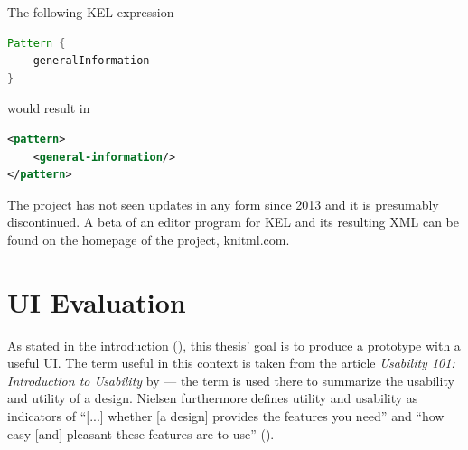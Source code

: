The following KEL expression

\begin{lstlisting}[language=Java, caption=Example expression in KnitML]
Pattern {
    generalInformation
}
\end{lstlisting}

would result in

\begin{lstlisting}[language=XML, caption=Example expression in KnitML: XML result]
<pattern>
    <general-information/>
</pattern>
\end{lstlisting}

The project has not seen updates in any form since 2013 and it is presumably discontinued. A beta of an editor program for KEL and its resulting XML can be found on the homepage of the project, knitml.com.

\section{UI Evaluation}
\label{uievaluation}
As stated in the introduction (), this thesis' goal is to produce a prototype with a useful \gls{UI}.
The term useful in this context is taken from the article \textit{Usability 101: Introduction to Usability} by \cite{nielsen2014} --- the term is used there to summarize the usability and utility of a design. Nielsen furthermore defines utility and usability as indicators of ``[...] whether [a design] provides the features you need'' and ``how easy [and] pleasant these features are to use'' (\cite{nielsen2014}).